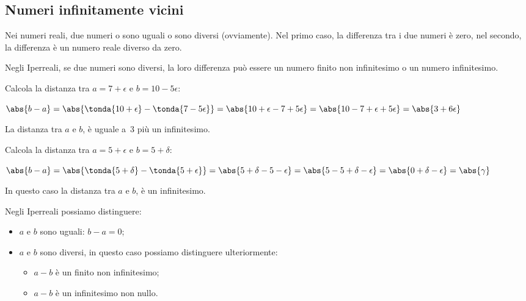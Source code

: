 \begin{esempio}
\begin{enumerate}
\end{enumerate}
\end{esempio}

\subsection{Numeri infinitamente vicini}
\label{subsec:insnum_infinitamentevicini}

Nei numeri reali, due numeri o sono uguali o sono diversi (ovviamente).
Nel primo caso, la differenza tra i due numeri è zero, 
nel secondo, la differenza è un numero reale diverso da zero.

Negli Iperreali, se due numeri sono diversi, la loro differenza può 
essere un numero finito non infinitesimo o un numero infinitesimo.

\begin{esempio}
 Calcola la distanza tra \(a=7+\epsilon\) e \(b=10-5\epsilon\):
 
 \(\abs{b-a}=\abs{\tonda{10+\epsilon} - \tonda{7-5\epsilon}}=
   \abs{10+\epsilon - 7+5\epsilon}=
   \abs{10-7 + \epsilon+5\epsilon}=
   \abs{3 + 6\epsilon}
 \)
 
 La distanza tra \(a\) e \(b\), è uguale a~3 più un infinitesimo.
\end{esempio}

\begin{esempio}
 Calcola la distanza tra \(a=5+\epsilon\) e \(b=5+\delta\):
 
 \(\abs{b-a}=\abs{\tonda{5+\delta} - \tonda{5+\epsilon}}=
   \abs{5+\delta - 5-\epsilon}=
   \abs{5-5 + \delta - \epsilon}=
   \abs{0 + \delta - \epsilon} = \abs{\gamma}
 \)
 
 In questo caso la distanza tra \(a\) e \(b\), è un infinitesimo.
\end{esempio}

\noindent Negli Iperreali possiamo distinguere:

\begin{itemize} [noitemsep]
 \item \(a\) e \(b\) sono uguali: \(b-a=0\);
 \item \(a\) e \(b\) sono diversi, in questo caso possiamo distinguere
 ulteriormente:
\begin{itemize} [nosep]
 \item \(a-b\) è un finito non infinitesimo;
 \item \(a-b\) è un infinitesimo non nullo.
\end{itemize}
\end{itemize}

